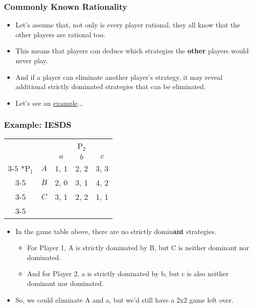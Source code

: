 \begin{frame}
\frametitle{Commonly Known Rationality}
\begin{itemize}
	\item Let's assume that, not only is every player rational, they all know that the other players are rational too.
	\item This means that players can deduce which strategies the \textbf{other} players would never play.
	\item And if a player can eliminate another player's strategy, it may reveal additional strictly dominated strategies that can be eliminated.
	\item Let's see an \href{https://www.youtube.com/watch?v=EZSx3zNZOaU}{example}...
\end{itemize}
\end{frame}

\begin{frame}
\frametitle{Example: IESDS}
\begin{table}[h]
	\centering
	\setlength{\extrarowheight}{2pt}
	\begin{tabular}{cc|c|c|c|}
		& \multicolumn{1}{c}{} & \multicolumn{3}{c}{P$_2$}\\
		& \multicolumn{1}{c}{} & \multicolumn{1}{c}{$a$} & \multicolumn{1}{c}{$b$} & \multicolumn{1}{c}{$c$} \\\cline{3-5}
		\multirow{3}*{P$_1$}  & $A$ & 1, 1 & 2, 2 & 3, 3 \\\cline{3-5}
		& $B$ & 2, 0 & 3, 1 & 4, 2 \\\cline{3-5}
		& $C$ & 3, 1 & 2, 2 & 1, 1  \\\cline{3-5}
	\end{tabular}
\end{table}
\begin{itemize}
	\item In the game table above, there are no strictly domin\textbf{ant} strategies.
	\begin{itemize}
		\item For Player 1, A is strictly dominated by B, but C is neither dominant nor dominated.
		\item And for Player 2, a is strictly dominated by b, but c is also neither dominant nor dominated.
	\end{itemize}
	\item So, we could eliminate A and a, but we'd still have a 2x2 game left over.
\end{itemize}
\end{frame}

